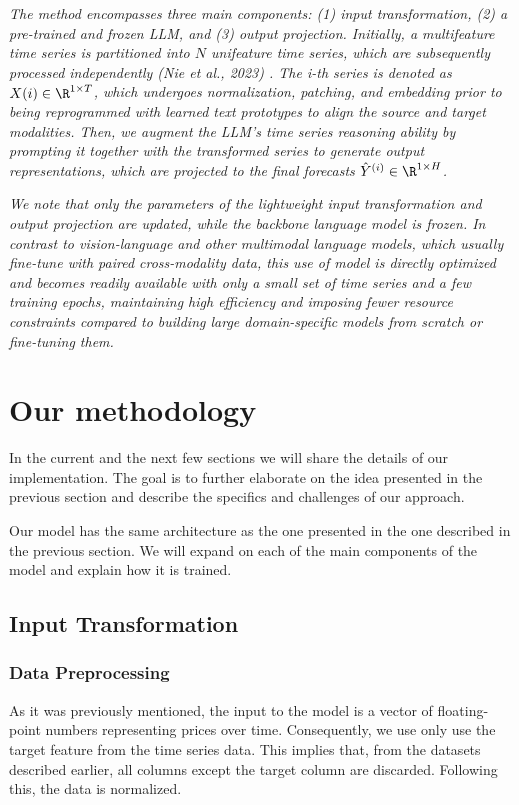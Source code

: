 \textit{The method encompasses three main components: (1) input transformation, (2) a pre-trained and frozen LLM, and (3) output projection. Initially, a multifeature time series is partitioned into \(N\) unifeature time series, which are subsequently processed independently (Nie et al., 2023) \cite{nie_et_al}.
	The i-th series is denoted as \(X(i) \in \R^{1\times T}\), which undergoes normalization, patching, and embedding prior to being reprogrammed with learned text prototypes to align the source and target modalities.
	Then, we augment the LLM’s time series reasoning ability by prompting it together with the transformed series to generate output representations, which are projected to the final forecasts \(\hat{Y}^{(i)} \in \R^{1\times H}\).}

\textit{We note that only the parameters of the lightweight input transformation and output projection are updated, while the backbone language model is frozen.
	In contrast to vision-language and other multimodal language models, which usually fine-tune with paired cross-modality data, this use of model is directly optimized and becomes readily available with only a small set of time series and a few  training epochs, maintaining high efficiency and imposing fewer resource constraints compared to building large domain-specific models from scratch or fine-tuning them.}

\section{Our methodology}
In the current and the next few sections we will share the details of our implementation. The goal is to further elaborate on the idea presented in the previous section and describe the specifics and challenges of our approach.

Our model has the same architecture as the one presented in the one described in the previous section. We will expand on each of the main components of the model and explain how it is trained.

\subsection{Input Transformation}

\subsubsection*{Data Preprocessing}
As it was previously mentioned, the input to the model is a vector of floating-point numbers representing prices over time. Consequently, we use only use the target feature from the time series data. This implies that, from the datasets described earlier, all columns except the target column are discarded. Following this, the data is normalized.

